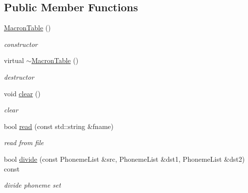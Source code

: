 \subsection*{\-Public \-Member \-Functions}
\begin{DoxyCompactItemize}
\item 
\hypertarget{classsinsy_1_1MacronTable_a137cccb1480580ac32f4a680e8896ec6}{\hyperlink{classsinsy_1_1MacronTable_a137cccb1480580ac32f4a680e8896ec6}{\-Macron\-Table} ()}\label{classsinsy_1_1MacronTable_a137cccb1480580ac32f4a680e8896ec6}

\begin{DoxyCompactList}\small\item\em constructor \end{DoxyCompactList}\item 
\hypertarget{classsinsy_1_1MacronTable_a44defde6b551d1e86da4a10df717a8c8}{virtual \hyperlink{classsinsy_1_1MacronTable_a44defde6b551d1e86da4a10df717a8c8}{$\sim$\-Macron\-Table} ()}\label{classsinsy_1_1MacronTable_a44defde6b551d1e86da4a10df717a8c8}

\begin{DoxyCompactList}\small\item\em destructor \end{DoxyCompactList}\item 
\hypertarget{classsinsy_1_1MacronTable_a33de031c61b3728d396a019172e90297}{void \hyperlink{classsinsy_1_1MacronTable_a33de031c61b3728d396a019172e90297}{clear} ()}\label{classsinsy_1_1MacronTable_a33de031c61b3728d396a019172e90297}

\begin{DoxyCompactList}\small\item\em clear \end{DoxyCompactList}\item 
bool \hyperlink{classsinsy_1_1MacronTable_a00ff6032cc6c54767863b428a6c16504}{read} (const std\-::string \&fname)
\begin{DoxyCompactList}\small\item\em read from file \end{DoxyCompactList}\item 
\hypertarget{classsinsy_1_1MacronTable_ad95067afd473b04f25d3eccb957f997f}{bool \hyperlink{classsinsy_1_1MacronTable_ad95067afd473b04f25d3eccb957f997f}{divide} (const \-Phoneme\-List \&src, \-Phoneme\-List \&dst1, \-Phoneme\-List \&dst2) const }\label{classsinsy_1_1MacronTable_ad95067afd473b04f25d3eccb957f997f}

\begin{DoxyCompactList}\small\item\em divide phoneme set \end{DoxyCompactList}\end{DoxyCompactItemize}


